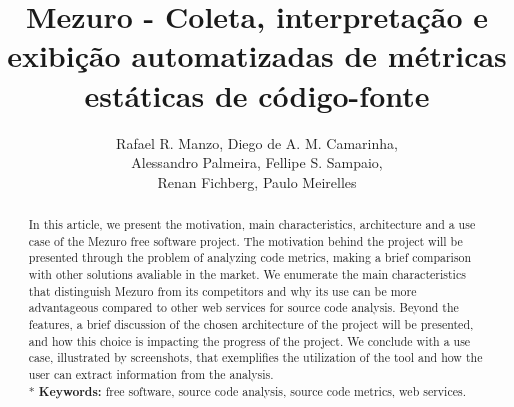 \documentclass[12pt]{article}
\begin{document}
\sloppy

\title{Mezuro - Coleta, interpretação e exibição automatizadas de métricas estáticas de código-fonte}

\author{Rafael R. Manzo, Diego de A. M. Camarinha,\\
        Alessandro Palmeira, Fellipe S. Sampaio,\\
        Renan Fichberg, Paulo Meirelles}


\address{Instituto de Matemática e Estatística -- Universidade de São Paulo (USP)\\
  Rua do Matão, 1010 -- 05508-090 -- Cidade Universitária -- São Paulo -- SP -- Brasil
\nextinstitute
  Faculdade de Engenharia -- UnB Gama (FGA)\\
  Gama -- DF -- Brasil
}


\maketitle

\begin{abstract}
  In this article, we present the motivation, main characteristics, architecture and a use case of the Mezuro free software project.
  The motivation behind the project will be presented through the problem of analyzing code metrics, making a brief comparison with
  other solutions avaliable in the market.
  We enumerate the main characteristics that distinguish Mezuro from its competitors and why its use can be more advantageous compared to other
  web services for source code analysis.
  Beyond the features, a brief discussion of the chosen architecture of the project will be presented, and how this choice is impacting the progress of the project.
  We conclude with a use case, illustrated by screenshots, that exemplifies the utilization of the tool and how the user can extract information from the analysis.
  \\*
  \textbf{Keywords:} free software, source code analysis, source code metrics, web services.
\end{abstract}
\end{document}
